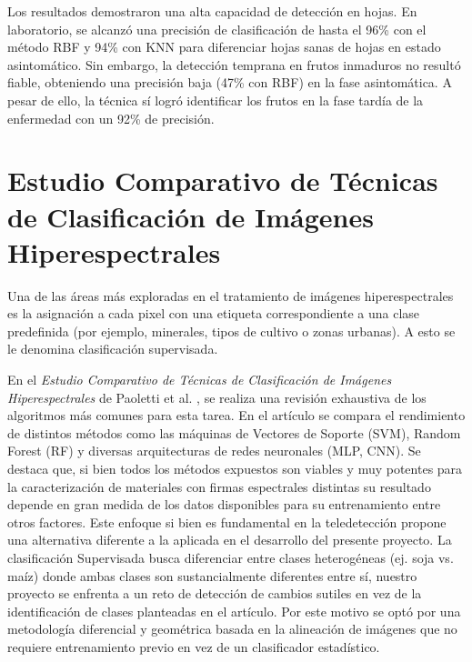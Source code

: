  Los resultados demostraron una alta capacidad de detección en hojas. En laboratorio, se alcanzó una precisión de clasificación de hasta el 96\% con el método RBF y 94\% con KNN para diferenciar hojas sanas de hojas en estado asintomático. Sin embargo, la detección temprana en frutos inmaduros no resultó fiable, obteniendo una precisión baja (47\% con RBF) en la fase asintomática. A pesar de ello, la técnica sí logró identificar los frutos en la fase tardía de la enfermedad con un 92\% de precisión.



\section{Estudio Comparativo de Técnicas de Clasificación de Imágenes Hiperespectrales}
Una de las áreas más exploradas en el tratamiento de imágenes hiperespectrales es la asignación a  cada pixel con una etiqueta correspondiente a una clase predefinida (por ejemplo, minerales, tipos de cultivo o zonas urbanas). A esto se le denomina clasificación supervisada.

 En el \textit{Estudio Comparativo de Técnicas de Clasificación de Imágenes Hiperespectrales} de Paoletti et al. \cite{Paoletti_Haut_Plaza_Plaza_2019}, se realiza una revisión exhaustiva de los algoritmos más comunes para esta tarea. En el artículo se compara el rendimiento de distintos métodos como las máquinas de Vectores de Soporte (SVM), Random Forest (RF) y diversas arquitecturas de redes neuronales (MLP, CNN). Se destaca que, si bien todos los métodos expuestos son viables y muy potentes para la caracterización de materiales con firmas espectrales distintas su resultado depende en gran medida de los datos disponibles para su entrenamiento entre otros factores.
 Este enfoque si bien es fundamental en la teledetección propone una alternativa diferente a la aplicada en el desarrollo del presente proyecto. La clasificación Supervisada busca diferenciar entre clases heterogéneas (ej. soja vs. maíz) donde ambas clases son sustancialmente diferentes entre sí, nuestro proyecto se enfrenta a un reto de detección de cambios sutiles en vez de la identificación de clases planteadas en el artículo. Por este motivo se optó por una metodología diferencial y geométrica basada en la alineación de imágenes que no requiere entrenamiento previo en vez de un clasificador estadístico.
